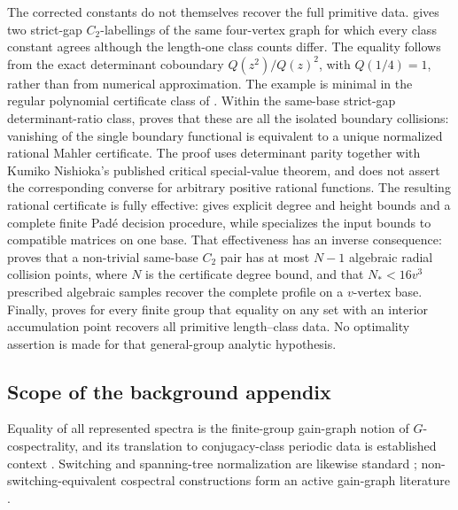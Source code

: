 The corrected constants do not themselves recover the full primitive data.
 gives two strict-gap \(C_2\)-labellings of
the same four-vertex graph for which every class constant agrees although the
length-one class counts differ.  The equality follows from the exact
determinant coboundary \(Q(z^2)/Q(z)^2\), with \(Q(1/4)=1\), rather than from
numerical approximation.  The example is minimal in the regular polynomial
certificate class of .  Within the
same-base strict-gap determinant-ratio class,
 proves that these are all the isolated
boundary collisions: vanishing of the single boundary functional is equivalent
to a unique normalized rational Mahler certificate.  The proof uses
determinant parity together with Kumiko Nishioka's published critical special-value
theorem, and does not assert the corresponding converse for arbitrary positive
rational functions.  The resulting rational certificate is fully effective:
 gives explicit degree and
height bounds and a complete finite Pad\'e decision procedure, while
 specializes the input bounds to
compatible matrices on one base.  That effectiveness has an inverse
consequence:  proves that a non-trivial
same-base \(C_2\) pair has at most \(N-1\) algebraic radial collision points,
where \(N\) is the certificate degree bound, and that
\(N_*<16v^3\) prescribed algebraic samples recover the complete profile on a
\(v\)-vertex base.  Finally,  proves for
every finite group that equality on any set with an interior accumulation
point recovers all primitive length--class data.  No optimality assertion is
made for that general-group analytic hypothesis.

\subsection{Scope of the background appendix}

Equality of all represented spectra is the finite-group gain-graph notion of
\(G\)-cospectrality, and its translation to conjugacy-class periodic data is
established context
\cite{CavaleriDAngeliDonno2021BalanceGainGraphs,
CavaleriDonno2022Cospectrality,BoyleSchmieding2017FiniteGroupExtensions}.
Switching and spanning-tree normalization are likewise standard
\cite{Zaslavsky1989BiasedGraphs,GrossTucker1987TopologicalGraphTheory};
non-switching-equivalent cospectral constructions form an active gain-graph
literature \cite{AbiadBelardoKhramova2024Switching}.

